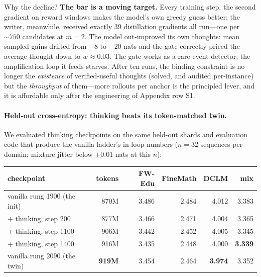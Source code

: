 \documentclass{article} %
\begin{document}
Why the decline? \textbf{The bar is a moving target.} Every training step, the second gradient on reward windows makes the model's own greedy guess better; the writer, meanwhile, received exactly 39 distillation gradients all run---one per ${\sim}750$ candidates at $m = 2$. The model out-improved its own thoughts: mean sampled gains drifted from $-8$ to $-20$ nats and the gate correctly priced the average thought down to $w \approx 0.03$. The gate works as a rare-event detector; the amplification loop it feeds starves. After ten runs, the binding constraint is no longer the \emph{existence} of verified-useful thoughts (solved, and audited per-instance) but the \emph{throughput} of them---more rollouts per anchor is the principled lever, and it is affordable only after the engineering of Appendix row S1.

\paragraph{Held-out cross-entropy: thinking beats its token-matched twin.} We evaluated thinking checkpoints on the same held-out shards and evaluation code that produce the vanilla ladder's in-loop numbers ($n{=}32$ sequences per domain; mixture jitter below $\pm 0.01$ nats at this $n$):

\begin{center}\small
\begin{tabular}{@{}lrrrrr@{}}
\toprule
checkpoint & tokens & FW-Edu & FineMath & DCLM & mix \\
\midrule
vanilla rung 1900 (the init) & 870M & 3.486 & 2.484 & 4.012 & 3.383 \\
\quad + thinking, step 200 & 877M & 3.466 & 2.471 & 4.004 & 3.365 \\
\quad + thinking, step 1100 & 906M & 3.442 & 2.452 & 4.005 & 3.345 \\
\quad + thinking, step 1400 & 916M & 3.435 & 2.448 & 4.000 & \textbf{3.339} \\
vanilla rung 2090 (the twin) & \textbf{919M} & 3.454 & 2.464 & \textbf{3.974} & 3.352 \\
\bottomrule
\end{tabular}
\end{center}
\end{document}
